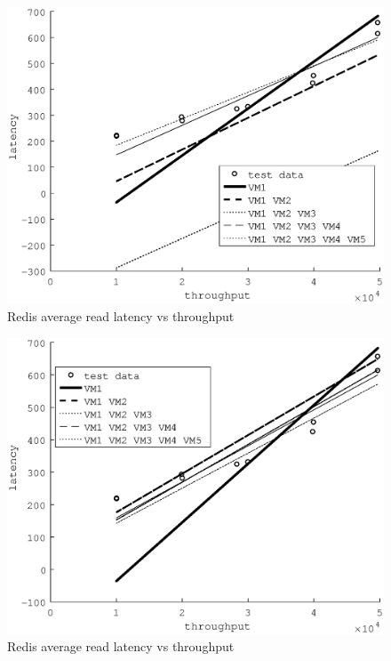 \documentclass{acm_proc_article-sp}
\begin{document}
\begin{figure}
\centering
\includegraphics[scale = 0.5]{fit_read_avg_latency_r3__r3_x_m3__m3_2x_r3_2x_m3_x.eps}
\caption{Redis average read latency vs throughput}
\label{figure:redisbarread}
\end{figure}

\begin{figure}
\centering
\includegraphics[scale = 0.5]{fit_read_avg_latency_r3__r3_2x_m3_2x_m3__m3_x_r3_x.eps}
\caption{Redis average read latency vs throughput}
\label{figure:redisbarread}
\end{figure}
\end{document}
